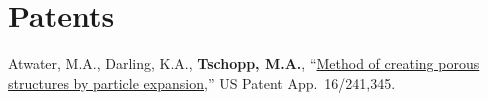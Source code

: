 \section{\sc Patents}

\begin{cvlist}
\setlength{\itemsep}{0in}
\setlength{\parsep}{0in} 
\setlength{\parskip}{0in}
\setlength{\topsep}{0in} 
\setlength{\partopsep}{0in} 
\setlength{\leftmargin}{0.2in}

\item
Atwater, M.A., Darling, K.A., \textbf{Tschopp, M.A.}, ``\href{https://patents.google.com/patent/US20200024692A1/en}{Method of creating porous structures by particle expansion},'' US Patent App.~16/241,345.

\end{cvlist}

